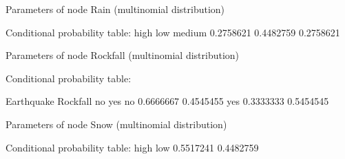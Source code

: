   Parameters of node Rain (multinomial distribution)

Conditional probability table:
      high       low    medium 
0.2758621 0.4482759 0.2758621 

  Parameters of node Rockfall (multinomial distribution)

Conditional probability table:
 
        Earthquake
Rockfall        no       yes
     no  0.6666667 0.4545455
     yes 0.3333333 0.5454545

  Parameters of node Snow (multinomial distribution)

Conditional probability table:
      high       low 
0.5517241 0.4482759 